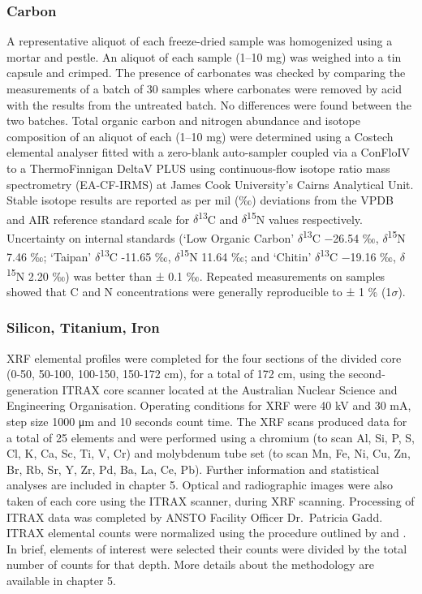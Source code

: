 \documentclass[
  12pt,
]{book}
\begin{document}
\hypertarget{carbon1}{%
\subsubsection{Carbon}\label{carbon1}}

A representative aliquot of each freeze-dried sample was homogenized using a mortar and pestle. An aliquot of each sample (1--10 mg) was weighed into a tin capsule and crimped. The presence of carbonates was checked by comparing the measurements of a batch of 30 samples where carbonates were removed by acid with the results from the untreated batch. No differences were found between the two batches. Total organic carbon and nitrogen abundance and isotope composition of an aliquot of each (1--10 mg) were determined using a Costech elemental analyser fitted with a zero-blank auto-sampler coupled via a ConFloIV to a ThermoFinnigan DeltaV PLUS using continuous-flow isotope ratio mass spectrometry (EA-CF-IRMS) at James Cook University's Cairns Analytical Unit. Stable isotope results are reported as per mil (‰) deviations from the VPDB and AIR reference standard scale for \(\delta\)\textsuperscript{13}C and \(\delta\)\textsuperscript{15}N values respectively. Uncertainty on internal standards (`Low Organic Carbon' \(\delta\)\textsuperscript{13}C −26.54 ‰, \(\delta\)\textsuperscript{15}N 7.46 ‰; `Taipan' \(\delta\)\textsuperscript{13}C -11.65 ‰, \(\delta\)\textsuperscript{15}N 11.64 ‰; and `Chitin' \(\delta\)\textsuperscript{13}C −19.16 ‰, \(\delta\)\textsuperscript{15}N 2.20 ‰) was better than ± 0.1 ‰. Repeated measurements on samples showed that C and N concentrations were generally reproducible to ± 1 \% (1\(\sigma\)).

\hypertarget{silicon-titanium-iron}{%
\subsubsection{Silicon, Titanium, Iron}\label{silicon-titanium-iron}}

XRF elemental profiles were completed for the four sections of the divided core (0-50, 50-100, 100-150, 150-172 cm), for a total of 172 cm, using the second-generation ITRAX core scanner located at the Australian Nuclear Science and Engineering Organisation. Operating conditions for XRF were 40 kV and 30 mA, step size 1000 μm and 10 seconds count time. The XRF scans produced data for a total of 25 elements and were performed using a chromium (to scan Al, Si, P, S, Cl, K, Ca, Sc, Ti, V, Cr) and molybdenum tube set (to scan Mn, Fe, Ni, Cu, Zn, Br, Rb, Sr, Y, Zr, Pd, Ba, La, Ce, Pb). Further information and statistical analyses are included in chapter 5. Optical and radiographic images were also taken of each core using the ITRAX scanner, during XRF scanning. Processing of ITRAX data was completed by ANSTO Facility Officer Dr.~Patricia Gadd. ITRAX elemental counts were normalized using the procedure outlined by \citet{rothwellNewTechniquesSediment2006} and \citet{weltjePredictionGeochemicalComposition2015}. In brief, elements of interest were selected their counts were divided by the total number of counts for that depth. More details about the methodology are available in chapter 5.
\end{document}
